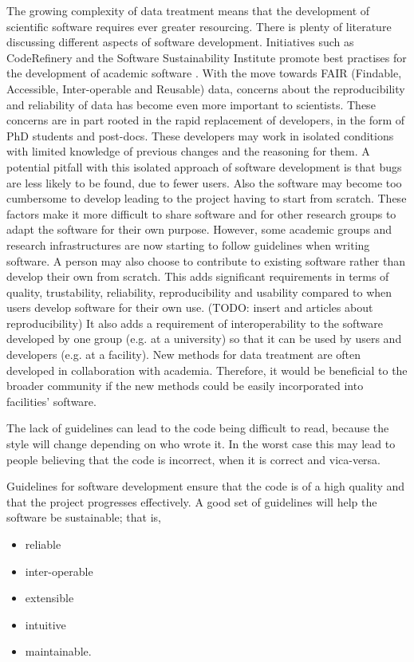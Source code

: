 \documentclass[jnr]{iosart2x}
\begin{document}
The growing complexity of data treatment means that the development of scientific software requires ever greater resourcing.
There is plenty of literature discussing different aspects of software development.
Initiatives such as CodeRefinery \cite{coderefinery} and the Software Sustainability Institute \cite{SoftwareSustainabilityInstitute} promote best practises for the development of academic software \cite{fair_software}.
With the move towards FAIR (Findable, Accessible, Inter-operable and Reusable) \cite{panosc} data, concerns about the reproducibility and reliability of data has become even more important to scientists.
These concerns are in part rooted in the rapid replacement of developers, in the form of PhD students and post-docs.
These developers may work in isolated conditions with limited knowledge of previous changes and the reasoning for them.
A potential pitfall with this isolated approach of software development is that bugs are less likely to be found, due to fewer users.
Also the software may become too cumbersome to develop leading to the project having to start from scratch.
These factors make it more difficult to share software and for other research groups to adapt the software for their own purpose.
However, some academic groups and research infrastructures are now starting to follow guidelines when writing software.
A person may also choose to contribute to existing software rather than develop their own from scratch.
This adds significant requirements in terms of quality, trustability, reliability, reproducibility and usability compared to when users develop software for their own use.
(TODO: insert \cite{computational-science-error} and articles about reproducibility)
It also adds a requirement of interoperability to the software developed by one group (e.g. at a university) so that it can be used by users and developers (e.g. at a facility).
New methods for data treatment are often developed in collaboration with academia.
Therefore, it would be beneficial to the broader community if the new methods could be easily incorporated into facilities' software.

The lack of guidelines can lead to the code being difficult to read, because the style will change depending on who wrote it.
In the worst case this may lead to people believing that the code is incorrect, when it is correct and vica-versa.

Guidelines for software development ensure that the code is of a high quality and that the project progresses effectively.
A good set of guidelines will help the software be sustainable; that is,
\begin{itemize}
\item{reliable}
\item{inter-operable}
\item{extensible}
\item{intuitive}
\item{maintainable.}
\end{itemize}
\end{document}
